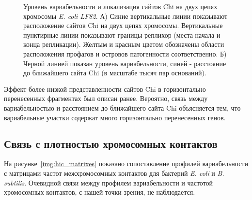 \begin{figure}[!ht] 
  \center
    
    
    \caption{Уровень вариабельности и локализация сайтов Chi на двух цепях хромосомы \textit{E. coli LF82}. А) Синие вертикальные линии показывают расположение сайтов Chi на двух цепях хромосомы. Вертикальные пунктирные линии показывают границы реплихор (места начала и конца репликации). Желтым и красным цветом обозначены области расположения профагов и островов патогенности соответственно. Б) Черной линией показан уровень вариабельности, синей - расстояние до ближайшего сайта Chi (в масштабе тысяч пар оснований).}
    \label{img:chi_lf82}
\end{figure}

Эффект более низкой представленности сайтов Chi в горизонтально перенесенных фрагментах был описан ранее\cite{halpern2007identification}. Вероятно, связь между вариабельностью и расстоянием до ближайшего сайта Chi объясняется тем, что вариабельные участки содержат много горизонтально перенесенных генов. 


\subsection{Связь с плотностью хромосомных контактов}


На рисунке~\ref{img:hic_matrixes} показано сопоставление профилей вариабельности с матрицами частот межхромосомных контактов для бактерий \textit{E. coli} и \textit{B. subtilis}. Очевидной связи между профилем вариабельности и частотой хромосомных контактов, с нашей точки зрения, не наблюдается.

